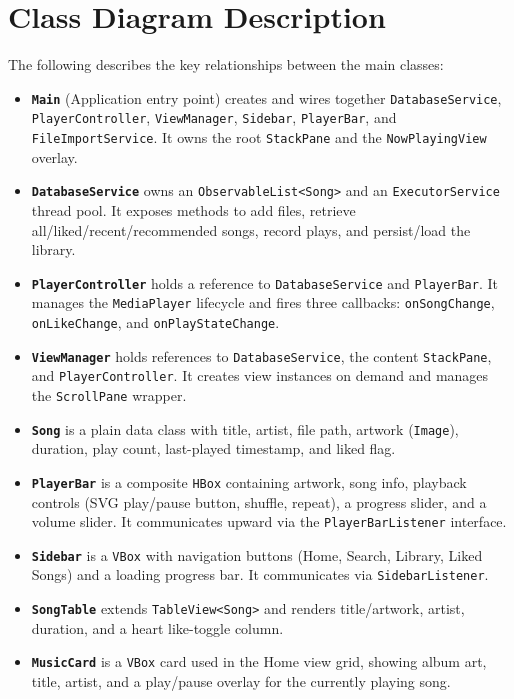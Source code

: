 ﻿\documentclass[12pt]{report}
\begin{document}
\section{Class Diagram Description}
The following describes the key relationships between the main classes:

\begin{itemize}
    \item \textbf{\texttt{Main}} (Application entry point) creates and wires together \texttt{DatabaseService}, \texttt{PlayerController}, \texttt{ViewManager}, \texttt{Sidebar}, \texttt{PlayerBar}, and \texttt{FileImportService}. It owns the root \texttt{StackPane} and the \texttt{NowPlayingView} overlay.

    \item \textbf{\texttt{DatabaseService}} owns an \texttt{ObservableList<Song>} and an \texttt{ExecutorService} thread pool. It exposes methods to add files, retrieve all/liked/recent/recommended songs, record plays, and persist/load the library.

    \item \textbf{\texttt{PlayerController}} holds a reference to \texttt{DatabaseService} and \texttt{PlayerBar}. It manages the \texttt{MediaPlayer} lifecycle and fires three callbacks: \texttt{onSongChange}, \texttt{onLikeChange}, and \texttt{onPlayStateChange}.

    \item \textbf{\texttt{ViewManager}} holds references to \texttt{DatabaseService}, the content \texttt{StackPane}, and \texttt{PlayerController}. It creates view instances on demand and manages the \texttt{ScrollPane} wrapper.

    \item \textbf{\texttt{Song}} is a plain data class with title, artist, file path, artwork (\texttt{Image}), duration, play count, last-played timestamp, and liked flag.

    \item \textbf{\texttt{PlayerBar}} is a composite \texttt{HBox} containing artwork, song info, playback controls (SVG play/pause button, shuffle, repeat), a progress slider, and a volume slider. It communicates upward via the \texttt{PlayerBarListener} interface.

    \item \textbf{\texttt{Sidebar}} is a \texttt{VBox} with navigation buttons (Home, Search, Library, Liked Songs) and a loading progress bar. It communicates via \texttt{SidebarListener}.

    \item \textbf{\texttt{SongTable}} extends \texttt{TableView<Song>} and renders title/artwork, artist, duration, and a heart like-toggle column.

    \item \textbf{\texttt{MusicCard}} is a \texttt{VBox} card used in the Home view grid, showing album art, title, artist, and a play/pause overlay for the currently playing song.
\end{itemize}
\end{document}
